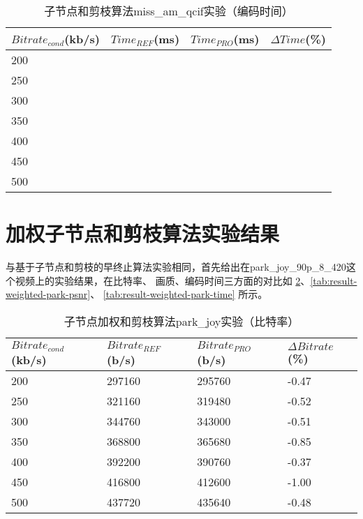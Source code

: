 \begin{table}[H]
  \centering
    \caption{子节点和剪枝算法miss\_am\_qcif实验（编码时间）}
    \label{tab:result-sum-miss-time}
    \begin{tabularx}{\linewidth}{XXXX}
      \toprule[1.5pt]
      $Bitrate_{cond}$(kb/s) & $Time_{REF}$(ms) & $Time_{PRO}$(ms) & $\Delta Time$(\%) \\
      \midrule[1pt]
      200 &  &  &   \\
      250 &  &  &  \\
      300 &  &  &  \\
      350 &  &  &  \\
      400 &  &  &   \\
      450 &  &  &  \\
      500 &  &  &  \\
      \bottomrule[1.5pt]
    \end{tabularx}
\end{table}


\section{加权子节点和剪枝算法实验结果}

与基于子节点和剪枝的早终止算法实验相同，首先给出在park\_joy\_90p\_8\_420这个视频上的实验结果，在比特率、
画质、编码时间三方面的对比如 \ref{tab:result-weighted-park-bitrate}、\ref{tab:result-weighted-park-psnr}、
\ref{tab:result-weighted-park-time} 所示。

\begin{table}[H]
  \caption{子节点加权和剪枝算法park\_joy实验（比特率）}
    \label{tab:result-weighted-park-bitrate}
    \begin{tabularx}{\linewidth}{XXXX}
      \toprule[1.5pt]
      $Bitrate_{cond}$(kb/s) & $Bitrate_{REF}$(b/s) & $Bitrate_{PRO}$(b/s) & $\Delta Bitrate$(\%) \\
      \midrule[1pt]
      200 & 297160 & 295760 & -0.47  \\
      250 & 321160 & 319480 & -0.52 \\
      300 & 344760 & 343000 & -0.51  \\
      350 & 368800 & 365680 & -0.85 \\
      400 & 392200 & 390760 & -0.37  \\
      450 & 416800 & 412600 & -1.00 \\
      500 & 437720 & 435640 & -0.48  \\
      \bottomrule[1.5pt]
    \end{tabularx}
\end{table}

